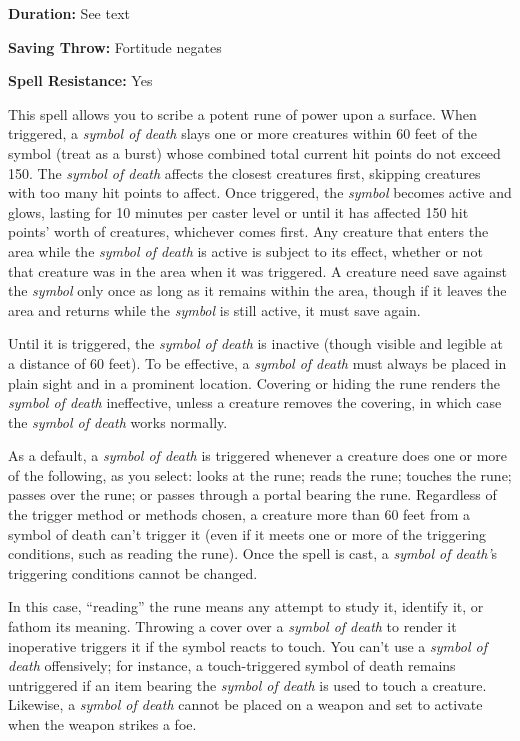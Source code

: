 \documentclass{article}
\begin{document}
\textbf{Duration:} See text

\textbf{Saving Throw:} Fortitude negates

\textbf{Spell Resistance:} Yes

This spell allows you to scribe a potent rune of power upon a surface. When triggered, 
a \textit{symbol of death }slays one or more creatures within 60 feet of the symbol 
(treat as a burst) whose combined total current hit points do not exceed 150. The 
\textit{symbol of death }affects the closest creatures first, skipping creatures 
with too many hit points to affect. Once triggered, the \textit{symbol }becomes 
active and glows, lasting for 10 minutes per caster level or until it has affected 
150 hit points' worth of creatures, whichever comes first. Any creature that enters 
the area while the \textit{symbol of death }is active is subject to its effect, 
whether or not that creature was in the area when it was triggered. A creature 
need save against the \textit{symbol }only once as long as it remains within the 
area, though if it leaves the area and returns while the \textit{symbol }is still 
active, it must save again.

Until it is triggered, the \textit{symbol of death }is inactive (though visible 
and legible at a distance of 60 feet). To be effective, a \textit{symbol of death 
}must always be placed in plain sight and in a prominent location. Covering or 
hiding the rune renders the \textit{symbol of death }ineffective, unless a creature 
removes the covering, in which case the \textit{symbol of death }works normally.

As a default, a \textit{symbol of death }is triggered whenever a creature does 
one or more of the following, as you select: looks at the rune; reads the rune; 
touches the rune; passes over the rune; or passes through a portal bearing the 
rune. Regardless of the trigger method or methods chosen, a creature more than 
60 feet from a symbol of death can't trigger it (even if it meets one or more of 
the triggering conditions, such as reading the rune). Once the spell is cast, a 
\textit{symbol of death'}s triggering conditions cannot be changed.

In this case, ``reading'' the rune means any attempt to study it, identify it, 
or fathom its meaning. Throwing a cover over a \textit{symbol of death }to render 
it inoperative triggers it if the symbol reacts to touch. You can't use a \textit{symbol 
of death }offensively; for instance, a touch-triggered symbol of death remains 
untriggered if an item bearing the \textit{symbol of death }is used to touch a 
creature. Likewise, a \textit{symbol of death }cannot be placed on a weapon and 
set to activate when the weapon strikes a foe.
\end{document}

